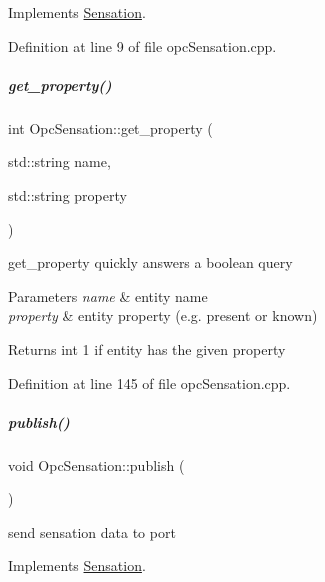 Implements \hyperlink{group__sensationManager_a118f1c62b03a665c9f80496dcf3124f6}{Sensation}.



Definition at line 9 of file opc\+Sensation.\+cpp.

\mbox{\label{group__sensationManager_a95124152fdd2d312222a9cf53115f87c}} 
\subparagraph{\texorpdfstring{get\+\_\+property()}{get\_property()}}
{\footnotesize\ttfamily int Opc\+Sensation\+::get\+\_\+property (\begin{DoxyParamCaption}\item[{std\+::string}]{name,  }\item[{std\+::string}]{property }\end{DoxyParamCaption})}



get\+\_\+property quickly answers a boolean query 


\begin{DoxyParams}{Parameters}
{\em name} & entity name \\
\hline
{\em property} & entity property (e.\+g. present or known) \\
\hline
\end{DoxyParams}
\begin{DoxyReturn}{Returns}
int 1 if entity has the given property 
\end{DoxyReturn}


Definition at line 145 of file opc\+Sensation.\+cpp.

\mbox{\label{group__sensationManager_aeec83c521a72fcc52558f6f3df2f48c9}} 
\subparagraph{\texorpdfstring{publish()}{publish()}}
{\footnotesize\ttfamily void Opc\+Sensation\+::publish (\begin{DoxyParamCaption}{ }\end{DoxyParamCaption})\hspace{0.3cm}{\ttfamily [virtual]}}



send sensation data to port 



Implements \hyperlink{group__sensationManager_ad37c802d993694d36f6794e597b35c8c}{Sensation}.



